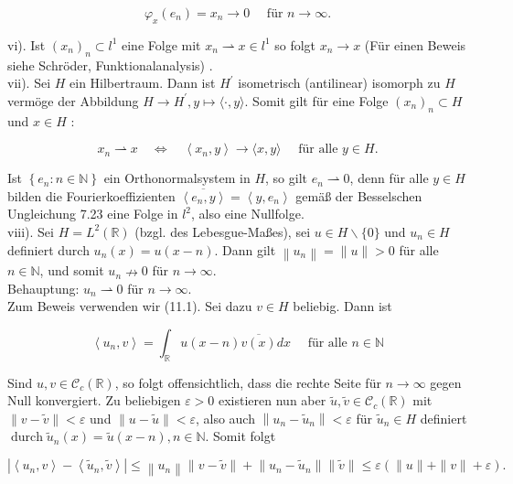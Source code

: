 \documentclass[10pt, letterpaper]{article}
\begin{document}
$$
\varphi_{x}\left(e_{n}\right)=x_{n} \rightarrow 0 \quad \text { für } n \rightarrow \infty .
$$

vi). Ist $\left(x_{n}\right)_{n} \subset l^{1}$ eine Folge mit $x_{n} \rightharpoonup x \in l^{1}$ so folgt $x_{n} \rightarrow x$ (Für einen Beweis siehe Schröder, Funktionalanalysis) .\\
vii). Sei $H$ ein Hilbertraum. Dann ist $H^{\prime}$ isometrisch (antilinear) isomorph zu $H$ vermöge der Abbildung $H \rightarrow H^{\prime}, y \mapsto\langle\cdot, y\rangle$. Somit gilt für eine Folge $\left(x_{n}\right)_{n} \subset H$ und $x \in H$ :

$$
x_{n} \rightharpoonup x \quad \Longleftrightarrow \quad\left\langle x_{n}, y\right\rangle \rightarrow\langle x, y\rangle \quad \text { für alle } y \in H .
$$

Ist $\left\{e_{n}: n \in \mathbb{N}\right\}$ ein Orthonormalsystem in $H$, so gilt $e_{n} \rightharpoonup 0$, denn für alle $y \in H$ bilden die Fourierkoeffizienten $\overline{\left\langle e_{n}, y\right\rangle}=\left\langle y, e_{n}\right\rangle$ gemäß der Besselschen Ungleichung 7.23 eine Folge in $l^{2}$, also eine Nullfolge.\\
viii). Sei $H=L^{2}(\mathbb{R})$ (bzgl. des Lebesgue-Maßes), sei $u \in H \backslash\{0\}$ und $u_{n} \in H$ definiert durch $u_{n}(x)=u(x-n)$. Dann gilt $\left\|u_{n}\right\|=\|u\|>0$ für alle $n \in \mathbb{N}$, und somit $u_{n} \nrightarrow 0$ für $n \rightarrow \infty$.\\
Behauptung: $u_{n} \rightharpoonup 0$ für $n \rightarrow \infty$.\\
Zum Beweis verwenden wir (11.1). Sei dazu $v \in H$ beliebig. Dann ist

$$
\left\langle u_{n}, v\right\rangle=\int_{\mathbb{R}} u(x-n) \overline{v(x)} d x \quad \text { für alle } n \in \mathbb{N}
$$

Sind $u, v \in \mathcal{C}_{c}(\mathbb{R})$, so folgt offensichtlich, dass die rechte Seite für $n \rightarrow \infty$ gegen Null konvergiert. Zu beliebigen $\varepsilon>0$ existieren nun aber $\tilde{u}, \tilde{v} \in \mathcal{C}_{c}(\mathbb{R})$ mit $\|v-\tilde{v}\|<\varepsilon$ und $\|u-\tilde{u}\|<\varepsilon$, also auch $\left\|u_{n}-\tilde{u}_{n}\right\|<\varepsilon$ für $\tilde{u}_{n} \in H$ definiert $\operatorname{durch} \tilde{u}_{n}(x)=\tilde{u}(x-n), n \in \mathbb{N}$. Somit folgt

$$
\left|\left\langle u_{n}, v\right\rangle-\left\langle\tilde{u}_{n}, \tilde{v}\right\rangle\right| \leq\left\|u_{n}\right\|\|v-\tilde{v}\|+\left\|u_{n}-\tilde{u}_{n}\right\|\|\tilde{v}\| \leq \varepsilon(\|u\|+\|v\|+\varepsilon) .
$$
\end{document}
